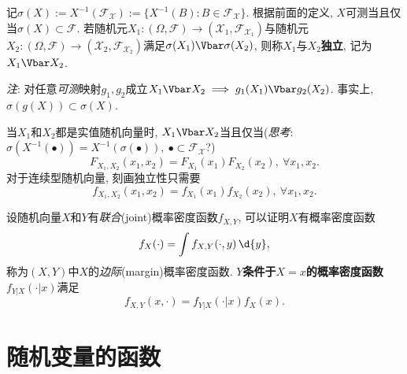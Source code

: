 \documentclass[../main]{subfiles}
\begin{document}
记$\sigma(X) := X^{-1}(\mathscr{F}_{\mathcal{X}}) := \{X^{-1}(B):B\in\mathscr{F}_{\mathcal{X}}\}$. 根据前面的定义, $X$可测当且仅当$\sigma(X) \subset \mathscr{F}$. 若随机元$X_{1} : (\Omega,\mathscr{F}) \to (\mathcal{X}_{1},\mathscr{F}_{\mathcal{X}_{1}})$与随机元$X_{2} : (\Omega,\mathscr{F}) \to (\mathcal{X}_{2},\mathscr{F}_{\mathcal{X}_{2}})$满足$\sigma(X_{1})\indep\sigma(X_{2})$, 则称$X_{1}$与$X_{2}$\textbf{独立}, 记为$X_{1} \indep X_{2}$.

\emph{注}: 对任意\emph{可测}映射$g_{1},g_{2}$成立$X_{1} \indep X_{2} \implies g_{1}(X_{1}) \indep g_{2}(X_{2})$. 事实上, $\sigma(g(X)) \subset \sigma(X)$.

当$X_{1}$和$X_{2}$都是实值随机向量时, $X_{1} \indep X_{2}$当且仅当(\emph{思考}: $\sigma(X^{-1}(\bullet)) = X^{-1}(\sigma(\bullet)), \ \bullet\subset\mathscr{F}_{\mathcal{X}}$?)
\[ F_{X_{1},X_{2}}(x_{1},x_{2}) = F_{X_{1}}(x_{1})F_{X_{2}}(x_{2}), \ \forall x_{1},x_{2}. \]
对于连续型随机向量, 刻画独立性只需要
\[ f_{X_{1},X_{2}}(x_{1},x_{2}) = f_{X_{1}}(x_{1})f_{X_{2}}(x_{2}), \ \forall x_{1},x_{2}. \]

设随机向量$X$和$Y$有\emph{联合}(joint)概率密度函数$f_{X,Y}$, 可以证明$X$有概率密度函数
\[ f_{X}(\cdot) = \int f_{X,Y}(\cdot,y) \,\d{y}, \] 称为$(X,Y)$中$X$的\emph{边际}(margin)概率密度函数. \textbf{$Y$条件于$X=x$的概率密度函数}$f_{Y|X}(\cdot|x)$满足
\[ f_{X,Y}(x,\cdot) = f_{Y|X}(\cdot|x)f_{X}(x). \]

\section{随机变量的函数}
\end{document}
